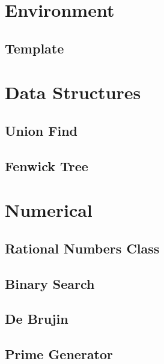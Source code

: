\documentclass{article}
\begin{document}
\begin{multicols}{2}
\tableofcontents
\end{multicols}
\newpage
\tiny


\begin{multicols}{3}

\section{Environment}
\subsection{Template}


\section{Data Structures}
\subsection{Union Find}



\subsection{Fenwick Tree}


\section{Numerical}
\subsection{Rational Numbers Class}


\subsection{Binary Search}


\subsection{De Brujin}


\subsection{Prime Generator}



\end{multicols}
\end{document}
